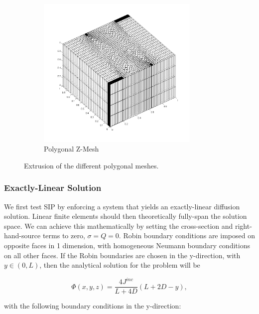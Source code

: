 \begin{figure}
\begin{subfigure}[b]{0.45\textwidth}
		\includegraphics[width=0.85\textwidth]{figures/sec_DSA/SIP_z_poly_extruded_mesh.png}
		\caption{Polygonal Z-Mesh}
	\end{subfigure}
\caption{Extrusion of the different polygonal meshes.}
\label{fig::SIP_mesh_extruded}
\end{figure}

\subsubsection{Exactly-Linear Solution}
\label{sec::DSA_Results_SIP_Linear}

We first test SIP by enforcing a system that yields an exactly-linear diffusion solution. Linear finite elements should then theoretically fully-span the solution space. We can achieve this mathematically by setting the cross-section and right-hand-source terms to zero, $\sigma = Q = 0$. Robin boundary conditions are imposed on opposite faces in 1 dimension, with homogeneous Neumann boundary conditions on all other faces. If the Robin boundaries are chosen in the y-direction, with $y \in (0,L)$, then the analytical solution for the problem will be 

\begin{equation}
\label{eq::SIP_mms_lin_solution}
\Phi(x,y,z) = \frac{4 J^{inc}}{L + 4D} \left(  L + 2 D - y \right),
\end{equation}

\noindent with the following boundary conditions in the y-direction:

